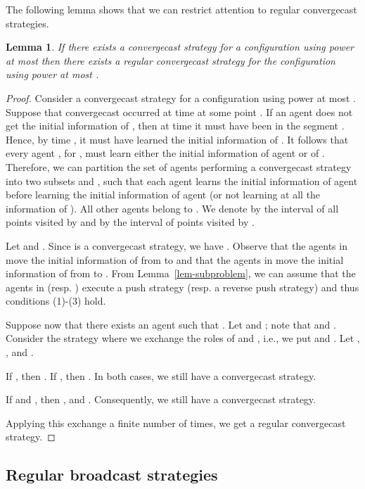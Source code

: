 \documentclass{article}
\newtheorem{lemma}{Lemma}
\newcommand\convergecast{convergecast\xspace}
\newcommand\broadcast{broadcast\xspace}
\begin{document}
The following lemma shows that we can restrict attention to regular convergecast strategies.


\begin{lemma}\label{lem:regconv}
If there exists a {\convergecast} strategy for a configuration
 using power at most  then there exists a regular convergecast strategy for the configuration
 using power at most .
\end{lemma}

\begin{proof}
Consider a {\convergecast} strategy  for a configuration
 using power at most . Suppose that convergecast occurred at time  at some point .
If an agent  does not get the initial information of , then at time  it must have been in the segment 
. Hence, by time , it must have learned the initial information of . It follows that every
agent , for , must learn either the initial
information of agent  or of . Therefore, we can partition the
set of agents performing a {\convergecast} strategy into two subsets
 and , such that each agent  learns the initial
information of agent  before learning the initial information of
agent  (or not learning at all the information of ). All
other agents belong to . We denote by  the interval of
all points visited by  and by  the interval of points
visited by .

Let  and . Since  is a convergecast strategy, we have . Observe that the agents in  move the initial information of  from
 to  and that the agents in  move the initial information of 
from  to . From Lemma~\ref{lem-subproblem}, we can
assume that the agents in  (resp. ) execute a push strategy (resp. a reverse push strategy)
and thus conditions (1)-(3) hold.


Suppose now that there exists an agent  such that .  Let  and
; note that  and . Consider the strategy where we exchange the roles of
 and , i.e., we put  and . Let , ,  and .

If , then . If , then . In both cases, we still have a
{\convergecast} strategy.

If  and , then ,
and . Consequently, we still have a {\convergecast} strategy.

Applying this exchange a finite number of times, we get a regular convergecast
strategy. 
\end{proof}

\subsection{Regular {\broadcast} strategies}
\end{document}
